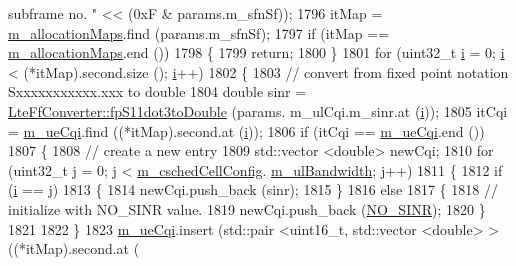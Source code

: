 \begin{DoxyCode}
{       subframe no. "} << (0xF & params.m\_sfnSf));
1796         itMap = \hyperlink{classns3_1_1TdMtFfMacScheduler_a08ce126c31d6c975542dfa7038bd27c8}{m\_allocationMaps}.find (params.m\_sfnSf);
1797         \textcolor{keywordflow}{if} (itMap == \hyperlink{classns3_1_1TdMtFfMacScheduler_a08ce126c31d6c975542dfa7038bd27c8}{m\_allocationMaps}.end ())
1798           \{
1799             \textcolor{keywordflow}{return};
1800           \}
1801         \textcolor{keywordflow}{for} (uint32\_t \hyperlink{bernuolliDistribution_8m_a6f6ccfcf58b31cb6412107d9d5281426}{i} = 0; \hyperlink{bernuolliDistribution_8m_a6f6ccfcf58b31cb6412107d9d5281426}{i} < (*itMap).second.size (); \hyperlink{bernuolliDistribution_8m_a6f6ccfcf58b31cb6412107d9d5281426}{i}++)
1802           \{
1803             \textcolor{comment}{// convert from fixed point notation Sxxxxxxxxxxx.xxx to double}
1804             \textcolor{keywordtype}{double} sinr = \hyperlink{classns3_1_1LteFfConverter_aa5d8c2a8f988dbd63da91818c18666eb}{LteFfConverter::fpS11dot3toDouble} (params.
      m\_ulCqi.m\_sinr.at (\hyperlink{bernuolliDistribution_8m_a6f6ccfcf58b31cb6412107d9d5281426}{i}));
1805             itCqi = \hyperlink{classns3_1_1TdMtFfMacScheduler_a586af40d969e8daa42c28b96a67b5854}{m\_ueCqi}.find ((*itMap).second.at (\hyperlink{bernuolliDistribution_8m_a6f6ccfcf58b31cb6412107d9d5281426}{i}));
1806             \textcolor{keywordflow}{if} (itCqi == \hyperlink{classns3_1_1TdMtFfMacScheduler_a586af40d969e8daa42c28b96a67b5854}{m\_ueCqi}.end ())
1807               \{
1808                 \textcolor{comment}{// create a new entry}
1809                 std::vector <double> newCqi;
1810                 \textcolor{keywordflow}{for} (uint32\_t j = 0; j < \hyperlink{classns3_1_1TdMtFfMacScheduler_a585412f686e33f49dad1003e5d2216f0}{m\_cschedCellConfig}.
      \hyperlink{structns3_1_1FfMacCschedSapProvider_1_1CschedCellConfigReqParameters_a5ab5b102878e6e7e7727a14af4a64d2f}{m\_ulBandwidth}; j++)
1811                   \{
1812                     \textcolor{keywordflow}{if} (\hyperlink{bernuolliDistribution_8m_a6f6ccfcf58b31cb6412107d9d5281426}{i} == j)
1813                       \{
1814                         newCqi.push\_back (sinr);
1815                       \}
1816                     \textcolor{keywordflow}{else}
1817                       \{
1818                         \textcolor{comment}{// initialize with NO\_SINR value.}
1819                         newCqi.push\_back (\hyperlink{cqa-ff-mac-scheduler_8h_a520d71777be043568160c783a9c65fd5}{NO\_SINR});
1820                       \}
1821 
1822                   \}
1823                 \hyperlink{classns3_1_1TdMtFfMacScheduler_a586af40d969e8daa42c28b96a67b5854}{m\_ueCqi}.insert (std::pair <uint16\_t, std::vector <double> > ((*itMap).second.at (

\end{DoxyCode}
